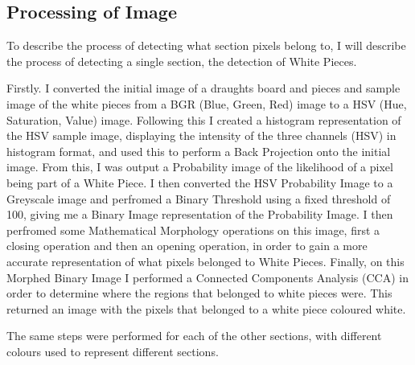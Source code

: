 \documentclass[12pt]{article}
\begin{document}
    \subsection{Processing of Image}
    \par
    To describe the process of detecting what section pixels belong to, I will describe the process of detecting a single section, the detection of White Pieces.
    \par
    Firstly. I converted the initial image of a draughts board and pieces and sample image of the white pieces from a BGR (Blue, Green, Red) image to a HSV (Hue, Saturation, Value) image. 
    Following this I created a histogram representation of the HSV sample image, displaying the intensity of the three channels (HSV) in histogram format, and used this to perform a Back Projection onto the initial image.
    From this, I was output a Probability image of the likelihood of a pixel being part of a White Piece. I then converted the HSV Probability Image to a Greyscale image and perfromed a Binary Threshold using a fixed threshold of 100,
    giving me a Binary Image representation of the Probability Image. I then perfromed some Mathematical Morphology operations on this image, first a closing operation and then an opening operation, in order to gain a more accurate
    representation of what pixels belonged to White Pieces. Finally, on this Morphed Binary Image I performed a Connected Components Analysis (CCA) in order to determine where the regions that belonged to white pieces were.
    This returned an image with the pixels that belonged to a white piece coloured white.
    \par
    The same steps were performed for each of the other sections, with different colours used to represent different sections. 
    \newpage
\end{document}
